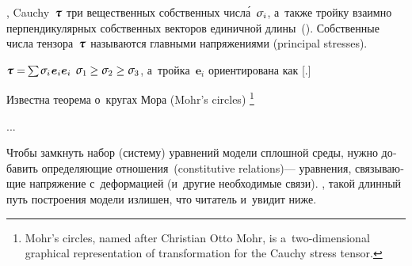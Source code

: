 \begin{otherlanguage}{russian}

,
Cauchy~$\cauchystress$
три вещественных собственных числ\'{а}~$\mathsigma_i$, а~также тройку взаимно перпендикулярных собственных векторов единичной длины~().
Собственные числа тензора~$\cauchystress$ называются главными напряжениями (principal stresses).

 ${\cauchystress = \hspace{-0.2ex} \sum \hspace{-0.15ex} \mathsigma_i \hspace{.15ex} \bm{e}_i \bm{e}_i}$    ${\mathsigma_1 \hspace{-0.1ex} \geq \mathsigma_2 \geq \mathsigma_3}$, а~тройка~${\bm{e}_i}$ ориентирована как [.]

Известна теорема о~кругах Мора (Mohr’s circles)%
\footnote{Mohr’s circles, named after Christian Otto Mohr, is a~two-dimensional graphical representation of transformation for the Cauchy stress tensor.}

...



Чтобы замкнуть набор (систему) уравнений модели сплошной среды, нужно добавить определяющие отношения~(constitutive relations)\:--- уравнения, связывающие напряжение с~деформацией (и~другие необходимые связи).
,
такой длинный путь построения модели излишен,
что читатель и~увидит ниже.

\end{otherlanguage}



